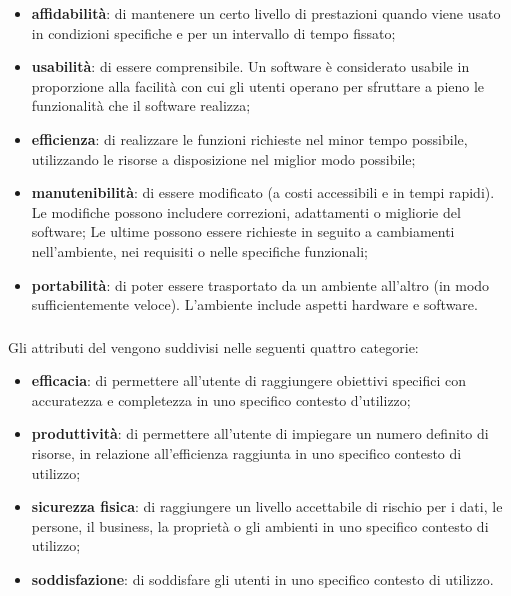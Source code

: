{\begin{itemize}
		\item \textbf{affidabilità}: {\rappr} di mantenere un certo livello di prestazioni quando viene usato in condizioni specifiche e per un intervallo di tempo fissato;
		
		\item \textbf{usabilità}: {\rappr} di essere comprensibile. Un software è considerato usabile in proporzione alla facilità con cui gli utenti operano per sfruttare a pieno le funzionalità che il software realizza;
		
		\item \textbf{efficienza}: {\rappr} di realizzare le funzioni richieste nel minor tempo possibile, utilizzando le risorse a disposizione nel miglior modo possibile;
		
		\item \textbf{manutenibilità}: {\rappr} di essere modificato (a costi accessibili e in tempi rapidi). Le modifiche possono includere correzioni, adattamenti o migliorie del software; Le ultime possono essere richieste in seguito a cambiamenti nell'ambiente, nei requisiti o nelle specifiche funzionali;
		
		\item \textbf{portabilità}: {\rappr} di poter essere trasportato da un ambiente all'altro (in modo sufficientemente veloce). L'ambiente include aspetti hardware e software.
	\end{itemize}

	\subsubsection{\Qumodel}
	Gli attributi del {\qumodel} vengono suddivisi nelle seguenti quattro categorie:
		\begin{itemize}
			\item \textbf{efficacia}: {\rappr} di permettere all'utente di raggiungere obiettivi specifici con accuratezza e completezza in uno specifico contesto d'utilizzo;
			\item \textbf{produttività}: {\rappr} di permettere all'utente di impiegare un numero definito di risorse, in relazione all'efficienza raggiunta in uno specifico contesto di utilizzo;
			\item \textbf{sicurezza fisica}: {\rappr} di raggiungere un livello accettabile di rischio per i dati, le persone, il business, la proprietà o gli ambienti in uno specifico contesto di utilizzo;
			\item \textbf{soddisfazione}: {\rappr} di soddisfare gli utenti in uno specifico contesto di utilizzo.
		\end{itemize}
	
}
